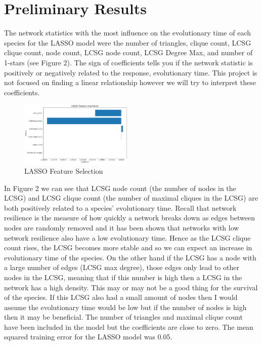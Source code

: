 \documentclass[12pt]{article}
\begin{document}
\section{Preliminary Results}
The network statistics with the most influence on the evolutionary time of each species for the LASSO model were the number of triangles, clique count, LCSG clique count, node count, LCSG node count, LCSG Degree Max, and number of 1-stars (see Figure 2). The sign of coefficients tells you if the network statistic is positively or negatively related to the response, evolutionary time. This project is not focused on finding a linear relationship however we will try to interpret these coefficients.
\begin{figure}
  \vspace{-20pt}
  \begin{center}
    \includegraphics[width=0.48\textwidth]{PPIN_fig3}
  \end{center}
  \vspace{-20pt}
  \caption{LASSO Feature Selection}
  \vspace{-10pt}
\end{figure}
\indent In Figure 2 we can see that LCSG node count (the number of nodes in the LCSG) and LCSG clique count (the number of maximal cliques in the LCSG) are both positively related to a species' evolutionary time.  Recall that network resilience is the measure of how quickly a network breaks down as edges between nodes are randomly removed and it has been shown that networks with low network resilience also have a low evolutionary time. Hence as the LCSG clique count rises, the LCSG becomes more stable and so we can expect an increase in evolutionary time of the species. On the other hand if the LCSG has a node with a large number of edges (LCSG max degree), those edges only lead to other nodes in the LCSG, meaning that if this number is high then a LCSG in the network has a high density. This may or may not be a good thing for the survival of the species. If this LCSG also had a small amount of nodes then I would assume the evolutionary time would be low but if the number of nodes is high then it may be beneficial. The number of triangles and maximal clique count have been included in the model but the coefficients are close to zero. The mean squared training error for the LASSO model was 0.05. 
\end{document}
